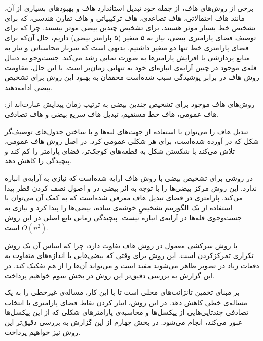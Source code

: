 \documentclass[12pt,a4paper]{article}
\numberwithin{equation}{section}
\numberwithin{figure}{section}
\theoremstyle{definition}
\theoremstyle{theorem}
\theoremstyle{definition}
\begin{document}
برخی از روش‌های هاف، از جمله خود تبدیل استاندارد هاف و بهبودهای بسیاری از آن، مانند هاف احتمالاتی، هاف تصاعدی، هاف ترکیبیاتی و هاف تقارن هندسی، که برای تشخیص خط بسیار موثر هستند، برای تشخیص چندین بیضی موثر نیستند. چرا که برای توصیف فضای پارامتری بیضی، نیاز به ۵ متغیر (۵ پارامتر بیضی) داریم، حال آن‌که برای فضای پارامتری خط تنها دو متغیر داشتیم. بدیهی است که سربار محاسباتی و نیاز به منابع پردازشی با افزایش پارامترها به صورت نمایی رشد می‌کند. جست‌وجو به دنبال قله‌ی موجود در چنین آرایه‌ی انباره‌ای خود به تنهایی زمان‌بر است. با این حال، مقاومت روش‌ هاف در برابر پوشیدگی سبب شده‌است محققان به بهبود این روش برای تشخیص بیضی ادامه‌دهند. 

روش‌های هاف موجود برای تشخیص چندین بیضی به ترتیب زمان پیدایش عبارت‌اند از: 
هاف عمومی\cite{GHT}، 
هاف خط مستقیم\cite{SLHT}، 
تبدیل هاف سریع بیضی\cite{FEHT} 
و هاف تصادفی‌\cite{RHT}.

تبدیل هاف را می‌توان با استفاده از جهت‌های لبه‌ها و با ساختن جدول‌های توصیف‌گر شکل که در \cite{GHT} آورده شده‌است، برای هر شکلی عمومی کرد. در اصل روش هاف عمومی، تلاش می‌کند با شکستن شکل به قطعه‌های کوچک‌تر، فضای پارامتر را کم کند و پیچیدگی را کاهش دهد.

در \cite{SLHT} روشی برای تشخیص بیضی با روش هاف ارایه شده‌است که نیازی به آرایه‌ی انباره ندارد. این روش مرکز بیضی‌ها را با توجه به اثر بیضی در  و اصول نصف کردن قطر پیدا می‌کند. پارامتری در فضای تبدیل هاف معرفی شده‌است که به کمک آن می‌توان با استفاده از یک الگوریتم تشخیصِ خوشه‌ی ساده، بیضی‌ها را پیدا کرد و نیازی به جست‌وجوی قله‌ها در آرایه‌ی انباره نیست. پیچیدگی زمانی تابع اصلی در این روش 
\( O(n^2) \)
است. 

 با روش سرکشی معمول در روش هاف تفاوت دارد، چرا که اساس آن یک روش تکراری تمرکزکردن
است\cite{FEHT}. این روش برای وقتی که بیضی‌هایی با اندازه‌های متفاوت به دفعات زیاد در تصویر ظاهر می‌شوند مفید است و می‌تواند آن‌ها را از هم تفکیک کند. در این گزارش به بررسی دقیق‌تر این روش در بخش سوم خواهیم پرداخت. 

بر مبنای تخمین تانژانت‌های محلی است تا با این کار، مساله‌ی غیرخطی را به یک مساله‌ی خطی کاهش دهد. در این روش، انبار کردن نقاط فضای پارامتری با انتخاب تصادفی چندتایی‌هایی از پیکسل‌ها و محاسبه‌ی پارامترهای شکلی که از این پیکسل‌ها عبور می‌کند، انجام می‌شود\cite{RHT}. در بخش چهارم از این گزارش به بررسی دقیق‌تر این روش نیز خواهیم پرداخت.
\end{document}
